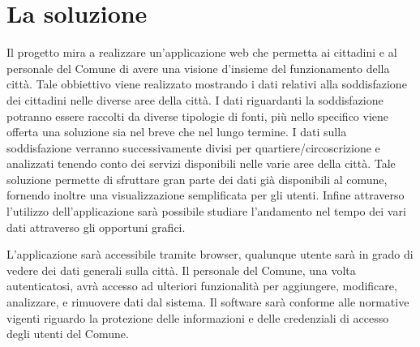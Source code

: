 \section{La soluzione}
   Il progetto mira a realizzare un'applicazione web che permetta ai cittadini e al personale del Comune di avere una visione d'insieme del funzionamento della città. Tale obbiettivo viene realizzato mostrando i dati relativi alla soddisfazione dei cittadini nelle diverse aree della città. I dati riguardanti la soddisfazione potranno essere raccolti da diverse tipologie di fonti, più nello specifico viene offerta una soluzione sia nel breve che nel lungo termine. I dati sulla soddisfazione verranno successivamente divisi per quartiere/circoscrizione e analizzati tenendo conto dei servizi disponibili nelle varie aree della città. Tale soluzione permette di sfruttare gran parte dei dati già disponibili al comune, fornendo inoltre una visualizzazione semplificata per gli utenti. Infine attraverso l'utilizzo dell'applicazione sarà possibile studiare l'andamento nel tempo dei vari dati attraverso gli opportuni grafici. 

    L'applicazione sarà accessibile tramite browser, qualunque utente sarà in grado di vedere dei dati generali sulla città. Il personale del Comune, una volta autenticatosi, avrà accesso ad ulteriori funzionalità per aggiungere, modificare, analizzare, e rimuovere dati dal sistema. Il software sarà conforme alle normative vigenti riguardo la protezione delle informazioni e delle credenziali di accesso degli utenti del Comune.
\newpage
